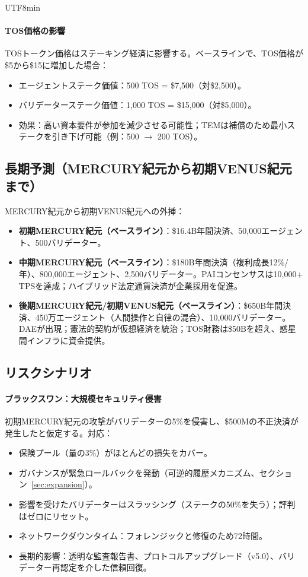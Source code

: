 \documentclass[11pt]{article}
\begin{document}
\begin{CJK}{UTF8}{min}
\paragraph{TOS価格の影響}
TOSトークン価格はステーキング経済に影響する。ベースラインで、TOS価格が\$5から\$15に増加した場合：
\begin{itemize}[noitemsep]
  \item エージェントステーク価値：500 TOS = \$7{,}500（対\$2{,}500）。
  \item バリデーターステーク価値：1,000 TOS = \$15{,}000（対\$5{,}000）。
  \item 効果：高い資本要件が参加を減少させる可能性；TEMは補償のため最小ステークを引き下げ可能（例：500 $\to$ 200 TOS）。
\end{itemize}

\subsection{長期予測（MERCURY紀元から初期VENUS紀元まで）}
MERCURY紀元から初期VENUS紀元への外挿：
\begin{itemize}[noitemsep]
  \item \textbf{初期MERCURY紀元（ベースライン）}：\$16.4B年間決済、50,000エージェント、500バリデーター。
  \item \textbf{中期MERCURY紀元（ベースライン）}：\$180B年間決済（複利成長12\%/年）、800,000エージェント、2,500バリデーター。PAIコンセンサスは10,000+ TPSを達成；ハイブリッド法定通貨決済が企業採用を促進。
  \item \textbf{後期MERCURY紀元/初期VENUS紀元（ベースライン）}：\$650B年間決済、450万エージェント（人間操作と自律の混合）、10,000バリデーター。DAEが出現；憲法的契約が仮想経済を統治；TOS財務は\$50Bを超え、惑星間インフラに資金提供。
\end{itemize}

\subsection{リスクシナリオ}
\paragraph{ブラックスワン：大規模セキュリティ侵害}
初期MERCURY紀元の攻撃がバリデーターの5\%を侵害し、\$500Mの不正決済が発生したと仮定する。対応：
\begin{itemize}[noitemsep]
  \item 保険プール（量の3\%）がほとんどの損失をカバー。
  \item ガバナンスが緊急ロールバックを発動（可逆的履歴メカニズム、セクション~\ref{sec:expansion}）。
  \item 影響を受けたバリデーターはスラッシング（ステークの50\%を失う）；評判はゼロにリセット。
  \item ネットワークダウンタイム：フォレンジックと修復のため72時間。
  \item 長期的影響：透明な監査報告書、プロトコルアップグレード（v5.0）、バリデーター再認定を介した信頼回復。
\end{itemize}


\end{CJK}
\end{document}
